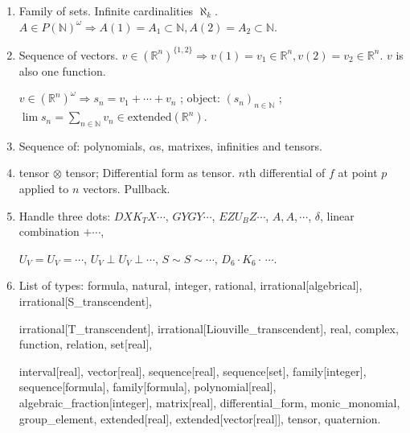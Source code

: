 \documentclass[11pt,a4paper]{article}
\newenvironment{myenum}
{ \begin{enumerate}
    \setlength{\itemsep}{0pt}
    \setlength{\parskip}{0pt}
    \setlength{\parsep}{0pt}     }
{ \end{enumerate}                  }
\begin{document}
\begin{myenum}
		$f \in (\text{Range}^\text{Dom})^{\{1,2\}} \Rightarrow f(1) = f_1 \in C(]0,1[, \mathbb{R}), f(2) = f_2 \in C(]0,1[, \mathbb{R})$.

		$f \in (\text{Range}^\text{Dom})^\omega \Rightarrow$ object: $(f_n)_{n \in \mathbb{N}}$ ; $\lim f_n = f \in C(]0,1[, \text{extended}(\mathbb{R}))$.

		$\sigma_n = f_1 + \cdots + f_n \Rightarrow$ object: $(\sigma_n)_{n \in \mathbb{N}}$ ; $\lim \sigma_n = \underset{n \in \mathbb{N}}{\sum} f_n = \sigma \in C(]0,1[, \text{extended}(\mathbb{R}))$.

		$f \in (\text{Range}^\text{Dom})^{]0,1[} \Rightarrow$ object: $(f_\lambda)_{\lambda \in ]0,1[}$.
		\item Family of sets. Infinite cardinalities $\aleph_k$. $A \in P(\mathbb{N})^\omega \Rightarrow A(1) = A_1 \subset \mathbb{N}, A(2) = A_2 \subset \mathbb{N}$.
		\item Sequence of vectors. $v \in (\mathbb{R}^n)^{\{1,2\}} \Rightarrow v(1) = v_1 \in \mathbb{R}^n, v(2) = v_2 \in \mathbb{R}^n$. $v$ is also one function.

		$v \in (\mathbb{R}^n)^\omega \Rightarrow s_n = v_1 + \cdots + v_n$ ; object: $(s_n)_{n \in \mathbb{N}}$ ; $\lim s_n = \underset{n \in \mathbb{N}}{\sum} v_n \in \text{extended}(\mathbb{R}^n)$.
		\item Sequence of: polynomials, $\alpha$s, matrixes, infinities and tensors.
		\item tensor $\otimes$ tensor; Differential form as tensor. $n$th differential of $f$ at point $p$ applied to $n$ vectors. Pullback.
		\item Handle three dots: $DXK_TX\cdots$, $GYGY\cdots$, $EZU_BZ\cdots$, $A, A, \cdots$, $\delta$, linear combination $+ \cdots$,

		$U_V=U_V=\cdots$, $U_V\perp U_V\perp\cdots$, $S \sim S \sim\cdots$, $D_6\cdot K_6\cdot\,\cdots$.
		\item List of types: formula, natural, integer, rational, irrational[algebrical], irrational[S\_transcendent],

		irrational[T\_transcendent], irrational[Liouville\_transcendent], real, complex, function, relation, set[real],

		interval[real], vector[real], sequence[real], sequence[set], family[integer], sequence[formula], family[formula], polynomial[real], algebraic\_fraction[integer], matrix[real], differential\_form, monic\_monomial, group\_element, extended[real], extended[vector[real]], tensor, quaternion.


\end{myenum}
\end{document}
